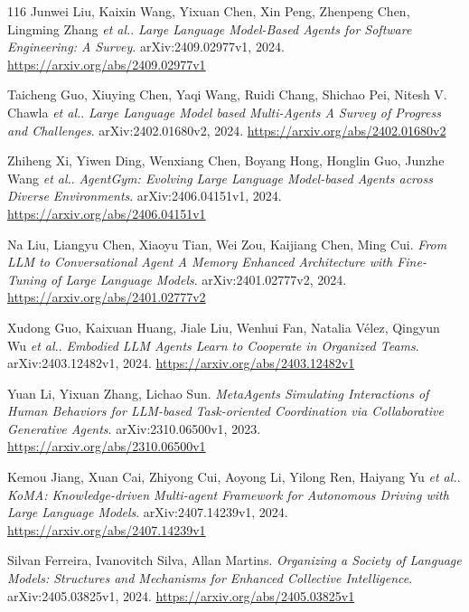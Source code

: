 \documentclass[11pt,a4paper]{article}
\begin{document}
\begin{thebibliography}{116}
Junwei Liu, Kaixin Wang, Yixuan Chen, Xin Peng, Zhenpeng Chen, Lingming Zhang \emph{et al.}.
\newblock \emph{Large Language Model-Based Agents for Software Engineering: A Survey}.
\newblock arXiv:2409.02977v1, 2024.
\newblock \url{https://arxiv.org/abs/2409.02977v1}

Taicheng Guo, Xiuying Chen, Yaqi Wang, Ruidi Chang, Shichao Pei, Nitesh V. Chawla \emph{et al.}.
\newblock \emph{Large Language Model based Multi-Agents A Survey of Progress and Challenges}.
\newblock arXiv:2402.01680v2, 2024.
\newblock \url{https://arxiv.org/abs/2402.01680v2}

Zhiheng Xi, Yiwen Ding, Wenxiang Chen, Boyang Hong, Honglin Guo, Junzhe Wang \emph{et al.}.
\newblock \emph{AgentGym: Evolving Large Language Model-based Agents across Diverse Environments}.
\newblock arXiv:2406.04151v1, 2024.
\newblock \url{https://arxiv.org/abs/2406.04151v1}

Na Liu, Liangyu Chen, Xiaoyu Tian, Wei Zou, Kaijiang Chen, Ming Cui.
\newblock \emph{From LLM to Conversational Agent A Memory Enhanced Architecture with Fine-Tuning of Large Language Models}.
\newblock arXiv:2401.02777v2, 2024.
\newblock \url{https://arxiv.org/abs/2401.02777v2}

Xudong Guo, Kaixuan Huang, Jiale Liu, Wenhui Fan, Natalia V\'{e}lez, Qingyun Wu \emph{et al.}.
\newblock \emph{Embodied LLM Agents Learn to Cooperate in Organized Teams}.
\newblock arXiv:2403.12482v1, 2024.
\newblock \url{https://arxiv.org/abs/2403.12482v1}

Yuan Li, Yixuan Zhang, Lichao Sun.
\newblock \emph{MetaAgents Simulating Interactions of Human Behaviors for LLM-based Task-oriented Coordination via Collaborative Generative Agents}.
\newblock arXiv:2310.06500v1, 2023.
\newblock \url{https://arxiv.org/abs/2310.06500v1}

Kemou Jiang, Xuan Cai, Zhiyong Cui, Aoyong Li, Yilong Ren, Haiyang Yu \emph{et al.}.
\newblock \emph{KoMA: Knowledge-driven Multi-agent Framework for Autonomous Driving with Large Language Models}.
\newblock arXiv:2407.14239v1, 2024.
\newblock \url{https://arxiv.org/abs/2407.14239v1}

Silvan Ferreira, Ivanovitch Silva, Allan Martins.
\newblock \emph{Organizing a Society of Language Models: Structures and Mechanisms for Enhanced Collective Intelligence}.
\newblock arXiv:2405.03825v1, 2024.
\newblock \url{https://arxiv.org/abs/2405.03825v1}


\end{thebibliography}
\end{document}
